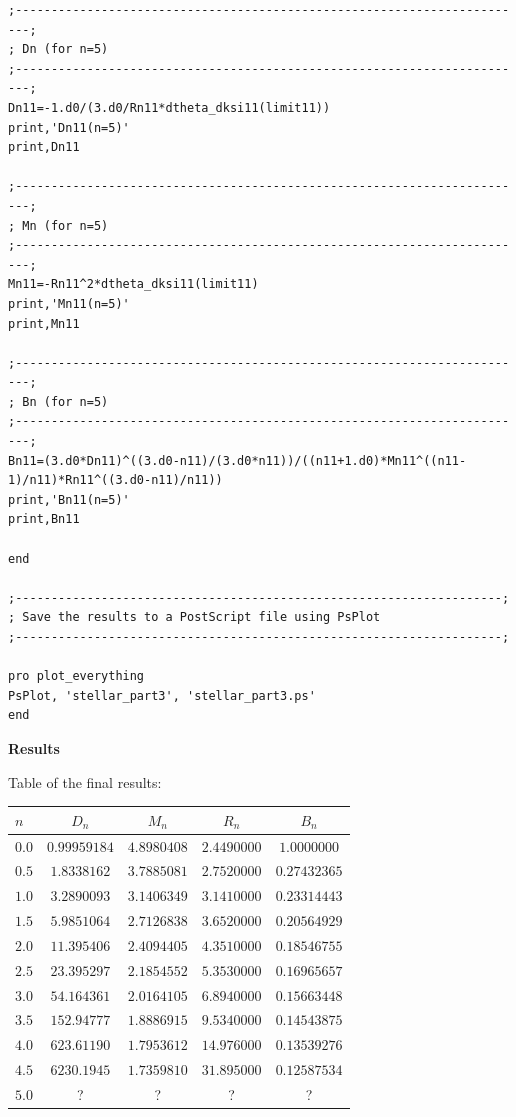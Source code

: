 \documentclass[a4paper,12pt]{article}
\begin{document}
\begin{itemize}
\begin{scriptsize}
\begin{verbatim}
;------------------------------------------------------------------------;
; Dn (for n=5)
;------------------------------------------------------------------------;
Dn11=-1.d0/(3.d0/Rn11*dtheta_dksi11(limit11))
print,'Dn11(n=5)'
print,Dn11

;------------------------------------------------------------------------;
; Mn (for n=5)
;------------------------------------------------------------------------;
Mn11=-Rn11^2*dtheta_dksi11(limit11)
print,'Mn11(n=5)'
print,Mn11

;------------------------------------------------------------------------;
; Bn (for n=5)
;------------------------------------------------------------------------;
Bn11=(3.d0*Dn11)^((3.d0-n11)/(3.d0*n11))/((n11+1.d0)*Mn11^((n11-1)/n11)*Rn11^((3.d0-n11)/n11))
print,'Bn11(n=5)'
print,Bn11

end

;--------------------------------------------------------------------;
; Save the results to a PostScript file using PsPlot
;--------------------------------------------------------------------;

pro plot_everything
PsPlot, 'stellar_part3', 'stellar_part3.ps'
end
\end{verbatim}
\end{scriptsize}

\newpage
\vspace{0.5cm}
\textbf{Results}

Table of the final results:

\vspace{0.5cm}
\begin{tabular}{|l|c|c|c|c|}
\hline
$n$ & $D_n$ & $M_n$ & $R_n$ & $B_n$ \\
\hline
$0.0$ & $0.99959184$ & $4.8980408$ & $2.4490000$ & $1.0000000$ \\
$0.5$ & $1.8338162$ & $3.7885081$ & $2.7520000$ & $0.27432365$ \\
$1.0$ & $3.2890093$ & $3.1406349$ & $3.1410000$ & $0.23314443$ \\
$1.5$ & $5.9851064$ & $2.7126838$ & $3.6520000$ & $0.20564929$ \\
$2.0$ & $11.395406$ & $2.4094405$ & $4.3510000$ & $0.18546755$ \\
$2.5$ & $23.395297$ & $2.1854552$ & $5.3530000$ & $0.16965657$ \\
$3.0$ & $54.164361$ & $2.0164105$ & $6.8940000$ & $0.15663448$ \\
$3.5$ & $152.94777$ & $1.8886915$ & $9.5340000$ & $0.14543875$ \\
$4.0$ & $623.61190$ & $1.7953612$ & $14.976000$ & $0.13539276$ \\
$4.5$ & $6230.1945$ & $1.7359810$ & $31.895000$ & $0.12587534$ \\
$5.0$ & ? & ? & ? & ? \\
\hline
\end{tabular}


\end{itemize}
\end{document}
